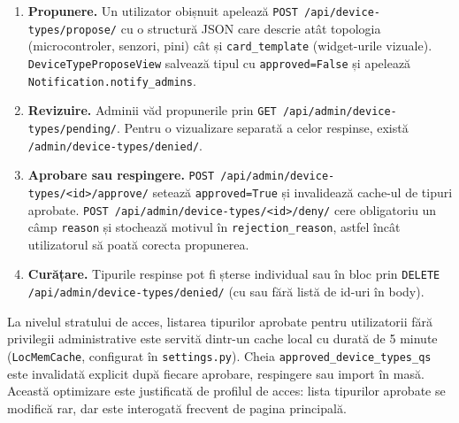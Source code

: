 \begin{enumerate}
    \item \textbf{Propunere.} Un utilizator obișnuit apelează \texttt{POST /api/device-types/propose/} cu o structură JSON care descrie atât topologia (microcontroler, senzori, pini) cât și \texttt{card\_template} (widget-urile vizuale). \texttt{DeviceTypeProposeView} salvează tipul cu \texttt{approved=False} și apelează \texttt{Notification.notify\_admins}.
    \item \textbf{Revizuire.} Adminii văd propunerile prin \texttt{GET /api/admin/device-types/pending/}. Pentru o vizualizare separată a celor respinse, există \texttt{/admin/device-types/denied/}.
    \item \textbf{Aprobare sau respingere.} \texttt{POST /api/admin/device-types/<id>/approve/} setează \texttt{approved=True} și invalidează cache-ul de tipuri aprobate. \texttt{POST /api/admin/device-types/<id>/deny/} cere obligatoriu un câmp \texttt{reason} și stochează motivul în \texttt{rejection\_reason}, astfel încât utilizatorul să poată corecta propunerea.
    \item \textbf{Curățare.} Tipurile respinse pot fi șterse individual sau în bloc prin \texttt{DELETE /api/admin/device-types/denied/} (cu sau fără listă de id-uri în body).
\end{enumerate}

La nivelul stratului de acces, listarea tipurilor aprobate pentru utilizatorii fără privilegii administrative este servită dintr-un cache local cu durată de 5 minute (\texttt{LocMemCache}, configurat în \texttt{settings.py}). Cheia \texttt{approved\_device\_types\_qs} este invalidată explicit după fiecare aprobare, respingere sau import în masă. Această optimizare este justificată de profilul de acces: lista tipurilor aprobate se modifică rar, dar este interogată frecvent de pagina principală.

